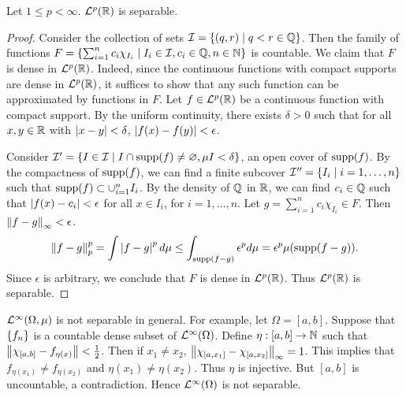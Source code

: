 \begin{theorem}
    Let $1\leq p<\infty$. $\mathcal{L}^p(\mathbb{R})$ is separable.
\end{theorem}
\begin{proof}
    Consider the collection of sets $\mathcal{I} = \left\{ (q,r) \;\middle\vert\; q<r\in\mathbb{Q} \right\}$. Then the 
    family of functions $F = \left\{ \sum_{i=1}^n c_i\chi_{I_i} \;\middle\vert\; I_i\in\mathcal{I}, c_i\in\mathbb{Q}, n\in\mathbb{N} \right\}$
    is countable. We claim that $F$ is dense in $\mathcal{L}^p(\mathbb{R})$. Indeed, since 
    the continuous functions with compact supports are dense in $\mathcal{L}^p(\mathbb{R})$, 
    it suffices to show that any such function can be approximated by 
    functions in $F$. Let $f\in\mathcal{L}^p(\mathbb{R})$ be a continuous function with 
    compact support. By the uniform continuity, there exists $\delta>0$ such 
    that for all $x,y\in\mathbb{R}$ with $\left\lvert {x-y} \right\rvert<\delta$, $\left\lvert {f(x)-f(y)} \right\rvert<\epsilon$. 

    Consider $\I' = \Set{I\in\I}{I\cap\supp{f}\neq\varnothing, \mu{I}<\delta}$, an 
    open cover of $\supp{f}$. By the compactness of $\supp{f}$, we can find a finite 
    subcover $\mathcal{I}'' = \left\{ I_i \;\middle\vert\; i=1,\ldots,n \right\}$ such that $\supp{f}\subset \cup_{i=1}^n I_i$.
    By the density of $\mathbb{Q}$ in $\mathbb{R}$, we can find $c_i\in\mathbb{Q}$ such that 
    $\left\lvert {f(x)-c_i} \right\rvert<\epsilon$ for all $x\in I_i$, for $i=1,\ldots,n$. 
    Let $g = \sum_{i=1}^n c_i\chi_{I_i}\in F$. Then $\left\lVert {f-g} \right\rVert_\infty < \epsilon$.
    \begin{equation*}
        \norm{f-g}_p^p = \int \abs{f-g}^pd\mu 
        \leq \int_{\supp{f-g}} \epsilon^pd\mu = \epsilon^p\mu(\supp{f-g}).
    \end{equation*}
    Since $\epsilon$ is arbitrary, we conclude that $F$ is dense in $\mathcal{L}^p(\mathbb{R})$. 
    Thus $\mathcal{L}^p(\mathbb{R})$ is separable.
\end{proof}
\begin{remark}
    $\mathcal{L}^\infty(\Omega,\mu)$ is not separable in general. For example, let 
    $\Omega = [a,b]$. Suppose that $\left\{ {f_n} \right\}$ is a countable dense subset of 
    $\mathcal{L}^\infty(\Omega)$. Define $\eta:[a,b]\to\mathbb{N}$ such that 
    $\left\lVert {\chi_{[a,b]} - f_{\eta(x)}} \right\rVert<\frac{1}{2}$. Then if $x_1\neq x_2$, 
    $\left\lVert {\chi_{[a,x_1]} - \chi_{[a,x_2]}} \right\rVert_\infty = 1$. This implies that 
    $f_{\eta(x_1)}\neq f_{\eta(x_2)}$ and $\eta(x_1)\neq\eta(x_2)$. Thus $\eta$ 
    is injective. But $[a,b]$ is uncountable, a contradiction. Hence
    $\mathcal{L}^\infty(\Omega)$ is not separable.
\end{remark}